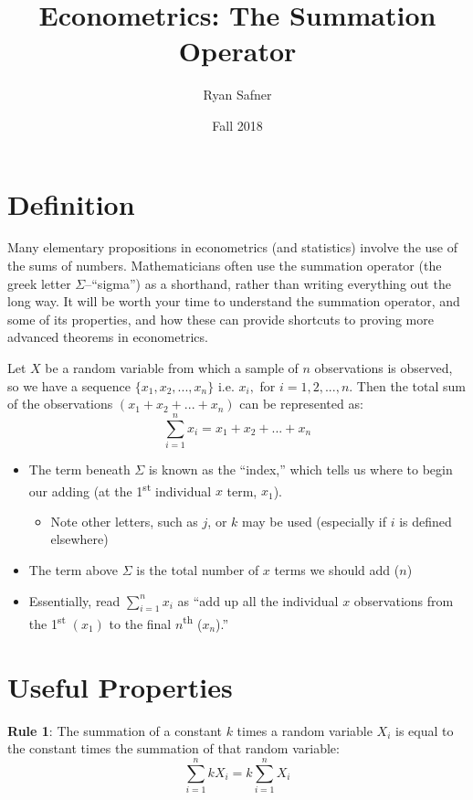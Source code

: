 \documentclass{article}
\title{Econometrics: The Summation Operator}
\author{Ryan Safner}
\date{Fall 2018}
\begin{document}
	\maketitle
	
\section{Definition}
Many elementary propositions in econometrics (and statistics) involve the use of the sums of numbers. Mathematicians often use the summation operator (the greek letter $\Sigma$--``sigma'') as a shorthand, rather than writing everything out the long way. It will be worth your time to understand the summation operator, and some of its properties, and how these can provide shortcuts to proving more advanced theorems in econometrics. 

Let $X$ be a random variable from which a sample of $n$ observations is observed, so we have a sequence $\{x_1, x_2,...,x_n\}$ i.e. $x_i, $ for $i=1,2,...,n$. Then the total sum of the observations $(x_1+x_2+...+x_n)$ can be represented as:
\begin{equation*}
\sum_{i=1}^n x_i = x_1+x_2+...+x_n
\end{equation*}
\begin{itemize}
	\item The term beneath $\Sigma$ is known as the ``index,'' which tells us where to begin our adding (at the 1\textsuperscript{st} individual $x$ term, $x_1$). 
	\begin{itemize}
		\item Note other letters, such as $j$, or $k$ may be used (especially if $i$ is defined elsewhere)
	\end{itemize} 
	\item The term above $\Sigma$ is the total number of $x$ terms we should add ($n$)
	\item Essentially, read $\displaystyle \sum_{i=1}^{n} x_i$ as ``add up all the individual $x$ observations from the 1\textsuperscript{st} $(x_1)$ to the final $n$\textsuperscript{th} ($x_n$).''  	
\end{itemize}

\section{Useful Properties}

\textbf{Rule 1}: The summation of a constant $k$ times a random variable $X_i$ is equal to the constant times the summation of that random variable: 
\begin{equation*}
\sum_{i=1}^n kX_i = k \sum^n_{i=1} X_i
\end{equation*}
\end{document}

